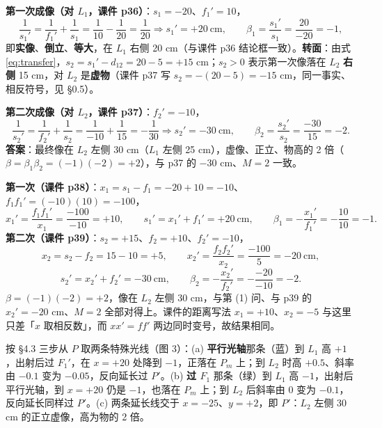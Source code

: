 \documentclass[11pt]{ctexart}
\begin{document}

\textbf{第一次成像（对 $L_1$，课件 p36）}：$s_1=-20$、$f_1'=10$，
\[
\frac{1}{s_1'}=\frac{1}{f_1'}+\frac{1}{s_1}=\frac{1}{10}-\frac{1}{20}=\frac{1}{20}
\Longrightarrow s_1'=+20\ \text{cm},\qquad
\beta_1=\frac{s_1'}{s_1}=\frac{20}{-20}=-1 ,
\]
即\textbf{实像}、\textbf{倒立}、\textbf{等大}，在 $L_1$ 右侧 20 cm（与课件 p36 结论框一致）。\textbf{转面}：由式 \eqref{eq:transfer}，$s_2=s_1'-d_{12}=20-5=+15$ cm；$s_2>0$ 表示第一次像落在 $L_2$ \textbf{右侧} 15 cm，对 $L_2$ 是\textbf{虚物}（课件 p37 写 $s_2=-(20-5)=-15$ cm，同一事实、相反符号，见 §0.5）。

\textbf{第二次成像（对 $L_2$，课件 p37）}：$f_2'=-10$，
\[
\frac{1}{s_2'}=\frac{1}{f_2'}+\frac{1}{s_2}=\frac{1}{-10}+\frac{1}{15}=-\frac{1}{30}
\Longrightarrow s_2'=-30\ \text{cm},\qquad
\beta_2=\frac{s_2'}{s_2}=\frac{-30}{15}=-2 .
\]
\textbf{答案}：最终像在 $L_2$ 左侧 30 cm（$L_1$ 左侧 25 cm），虚像、正立、物高的 2 倍（$\beta=\beta_1\beta_2=(-1)(-2)=+2$），与 p37 的 $-30$ cm、$M=2$ 一致。


\textbf{第一次（课件 p38）}：$x_1=s_1-f_1=-20+10=-10$、$f_1f_1'=(-10)(10)=-100$，
\[
x_1'=\frac{f_1f_1'}{x_1}=\frac{-100}{-10}=+10,\qquad
s_1'=x_1'+f_1'=+20\ \text{cm},\qquad
\beta_1=-\frac{x_1'}{f_1'}=-\frac{10}{10}=-1 .
\]
\textbf{第二次（课件 p39）}：$s_2=+15$、$f_2=+10$、$f_2'=-10$，
\[
x_2=s_2-f_2=15-10=+5,\qquad
x_2'=\frac{f_2f_2'}{x_2}=\frac{-100}{5}=-20\ \text{cm},
\]
\[
s_2'=x_2'+f_2'=-30\ \text{cm},\qquad
\beta_2=-\frac{x_2'}{f_2'}=-\frac{-20}{-10}=-2 .
\]
$\beta=(-1)(-2)=+2$，像在 $L_2$ 左侧 30 cm，与第 (1) 问、与 p39 的 $x_2'=-20$ cm、$M=2$ 全部对得上。课件的距离写法 $x_1=+10$、$x_2=-5$ 与这里只差「$x$ 取相反数」，而 $xx'=ff'$ 两边同时变号，故结果相同。



按 §4.3 三步从 $P$ 取两条特殊光线（图 3）：(a) \textbf{平行光轴}那条（蓝）到 $L_1$ 高 $+1$，出射后过 $F_1'$，在 $x=+20$ 处降到 $-1$，正落在 $P_m$ 上；到 $L_2$ 时高 $+0.5$、斜率由 $-0.1$ 变为 $-0.05$，反向延长过 $P'$。(b) \textbf{过 $F_1$} 那条（绿）到 $L_1$ 高 $-1$，出射后平行光轴，到 $x=+20$ 仍是 $-1$，也落在 $P_m$ 上；到 $L_2$ 后斜率由 $0$ 变为 $-0.1$，反向延长同样过 $P'$。(c) 两条延长线交于 $x=-25$、$y=+2$，即 $P'$：$L_2$ 左侧 30 cm 的正立虚像，高为物的 2 倍。
\end{document}
